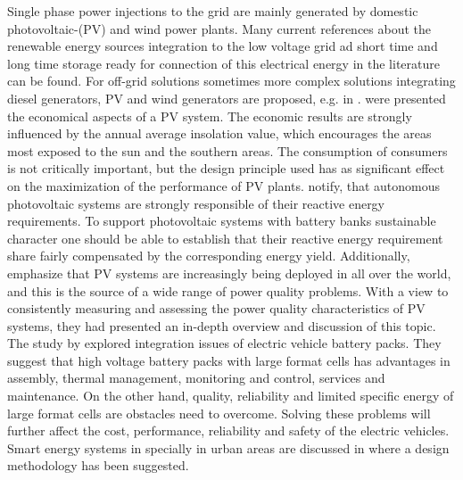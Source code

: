 Single phase power injections to the grid are mainly generated by domestic photovoltaic-(PV) and wind power plants. Many current references about the renewable energy sources integration to the low voltage grid ad short time and long time storage ready for connection of this electrical energy in the literature can be found. For off-grid solutions sometimes more complex solutions integrating diesel generators, PV and wind generators are proposed, e.g. in \cite{shezan2016}. \cite{cucchiella2013environmental} were presented the economical aspects of a PV system. The economic results are strongly influenced by the annual average insolation value, which encourages the areas most exposed to the sun and the southern areas. The consumption of consumers is not critically important, but the design principle used has as significant effect on the maximization of the performance of PV plants. \cite{kaldellis2009optimum} notify, that autonomous photovoltaic systems are strongly responsible of their reactive energy requirements. To support photovoltaic systems with battery banks sustainable character one should be able to establish that their reactive energy requirement share fairly compensated by the corresponding energy yield.  Additionally, \cite{ortega2013measurement} emphasize that PV systems are increasingly being deployed in all over the world, and this is the source of a wide range of power quality problems. With a view to consistently measuring and assessing the power quality characteristics of PV systems, they had presented an in-depth overview and discussion of this topic. The study by \cite{huat2015integration} explored integration issues of electric vehicle battery packs. They suggest that high voltage battery packs with large format cells has advantages in assembly, thermal management, monitoring and control, services and maintenance. On the other hand, quality, reliability and limited specific energy of large format cells are obstacles need to overcome. Solving these problems will further affect the cost, performance, reliability and safety of the electric vehicles. Smart energy systems in specially in urban areas are discussed in \cite{lund2015smart} where a design methodology has been suggested.
